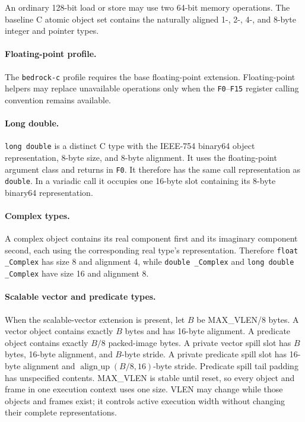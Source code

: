 \documentclass[10pt,twoside]{article}
\begin{document}
An ordinary 128-bit load or store may use two 64-bit memory operations. The
baseline C atomic object set contains the naturally aligned 1-, 2-, 4-, and
8-byte integer and pointer types.

\paragraph{Floating-point profile.}
The \texttt{bedrock-c} profile requires the base floating-point extension.
Floating-point helpers may replace
unavailable operations only when the \texttt{F0}--\texttt{F15} register calling
convention remains available.

\paragraph{Long double.}
\texttt{long double} is a distinct C type with the IEEE-754 binary64 object
representation, 8-byte size, and 8-byte alignment. It uses the floating-point
argument class and returns in \texttt{F0}. It therefore has the same call
representation as \texttt{double}. In a variadic call it occupies one
16-byte slot containing its 8-byte binary64 representation.

\paragraph{Complex types.}
A complex object contains its real component first and its imaginary component
second, each using the corresponding real type's representation. Therefore
\texttt{float \_Complex} has size 8 and alignment 4, while
\texttt{double \_Complex} and \texttt{long double \_Complex} have size 16 and
alignment 8.

\paragraph{Scalable vector and predicate types.}
When the scalable-vector extension is present, let $B$ be MAX\_VLEN/8 bytes. A
vector object contains exactly $B$ bytes and has 16-byte alignment. A
predicate object contains exactly $B/8$ packed-image bytes. A private vector
spill slot has $B$ bytes, 16-byte alignment, and $B$-byte stride. A private
predicate spill slot has 16-byte alignment and
$\operatorname{align\_up}(B/8,16)$-byte stride. Predicate spill tail padding
has unspecified contents. MAX\_VLEN is stable until reset, so every object and
frame in one execution context uses one size. VLEN may change while those
objects and frames exist; it controls active execution width without changing
their complete representations.
\end{document}
